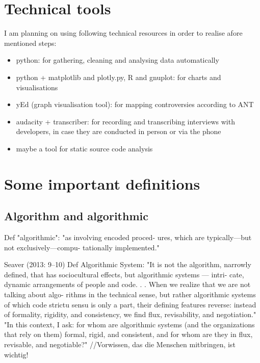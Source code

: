 \documentclass[pdftex,a4paper,11pt]{scrartcl}
\begin{document}
\section{Technical tools}

I am planning on using following technical resources in order to realise afore mentioned steps:

\begin{itemize}
    \item python: for gathering, cleaning and analysing data automatically
    \item python + matplotlib and plotly.py, R and gnuplot: for charts and visualisations
    \item yEd (graph visualisation tool): for mapping controversies according to ANT
    \item audacity + transcriber: for recording and transcribing interviews with developers, in case they are conducted in person or via the phone
    \item maybe a tool for static source code analysis
\end{itemize}

\section{Some important definitions}

\subsection{Algorithm and algorithmic}
Def "algorithmic": "as involving encoded proced-
ures, which are typically—but not exclusively—compu-
tationally implemented."~\cite{Geiger2017}

Seaver (2013: 9–10) Def Algorithmic System:
"It is not the algorithm, narrowly defined, that has
sociocultural effects, but algorithmic systems — intri-
cate, dynamic arrangements of people and code. . .
When we realize that we are not talking about algo-
rithms in the technical sense, but rather algorithmic
systems of which code strictu sensu is only a part,
their defining features reverse: instead of formality,
rigidity, and consistency, we find flux, revisability,
and negotiation."
"In this context, I ask: for whom are algorithmic systems
(and the organizations that rely on them) formal, rigid,
and consistent, and for whom are they in flux, revisable,
and negotiable?" //Vorwissen, das die Menschen mitbringen, ist wichtig!~\cite{Geiger2017}
\end{document}
